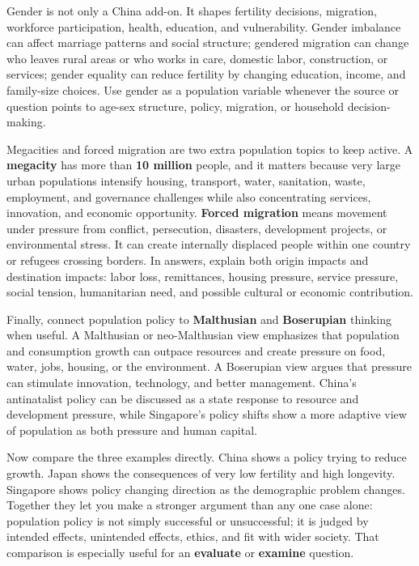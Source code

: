 \documentclass[11pt,a4paper]{article}
\newcommand{\term}[1]{\textcolor{HeadingBlue}{\textbf{#1}}}
\newcommand{\exam}[1]{\textcolor{AccentTeal}{\textbf{#1}}}
\begin{document}
Gender is not only a China add-on. It shapes fertility decisions, migration,
workforce participation, health, education, and vulnerability. Gender imbalance
can affect marriage patterns and social structure; gendered migration can change
who leaves rural areas or who works in care, domestic labor, construction, or
services; gender equality can reduce fertility by changing education, income,
and family-size choices. Use gender as a population variable whenever the source
or question points to age-sex structure, policy, migration, or household
decision-making.

Megacities and forced migration are two extra population topics to keep active.
A \term{megacity} has more than \term{10 million} people, and it matters because
very large urban populations intensify housing, transport, water, sanitation,
waste, employment, and governance challenges while also concentrating services,
innovation, and economic opportunity. \term{Forced migration} means movement
under pressure from conflict, persecution, disasters, development projects, or
environmental stress. It can create internally displaced people within one
country or refugees crossing borders. In answers, explain both origin impacts
and destination impacts: labor loss, remittances, housing pressure, service
pressure, social tension, humanitarian need, and possible cultural or economic
contribution.

Finally, connect population policy to \term{Malthusian} and
\term{Boserupian} thinking when useful. A Malthusian or neo-Malthusian view
emphasizes that population and consumption growth can outpace resources and
create pressure on food, water, jobs, housing, or the environment. A Boserupian
view argues that pressure can stimulate innovation, technology, and better
management. China's antinatalist policy can be discussed as a state response to
resource and development pressure, while Singapore's policy shifts show a more
adaptive view of population as both pressure and human capital.

Now compare the three examples directly. China shows a policy trying to reduce
growth. Japan shows the consequences of very low fertility and high longevity.
Singapore shows policy changing direction as the demographic problem changes.
Together they let you make a stronger argument than any one case alone:
population policy is not simply successful or unsuccessful; it is judged by
intended effects, unintended effects, ethics, and fit with wider society. That
comparison is especially useful for an \exam{evaluate} or \exam{examine}
question.
\end{document}
